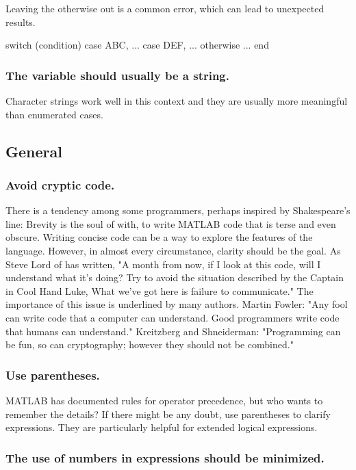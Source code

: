 \documentclass[titlepage,a4paper,12pt]{article}
\begin{document}
Leaving
the otherwise out is a common error, which can lead to unexpected
results.
\begin{verbmcode}
switch (condition)
    case ABC,
        ...
    case DEF,
        ...
    otherwise
        ...
end
\end{verbmcode}

\subsubsection{The  variable should usually be a string.}
 Character strings
work well in this context and they are usually more meaningful than
enumerated cases.

\subsection{General}

\subsubsection{Avoid cryptic code.}

 There is a tendency among some programmers,
perhaps inspired by Shakespeare's line: Brevity is the soul of with,
to write MATLAB code that is terse and even obscure. Writing concise
code can be a way to explore the features of the language. However,
in almost every circumstance, clarity should be the goal. As Steve
Lord of \TMW has written, "A month from now, if I look at this code,
will I understand what it's doing? Try to avoid the situation
described by the Captain in Cool Hand Luke, What we've got here is
failure to communicate." The importance of this issue is underlined
by many authors. Martin Fowler: "Any fool can write code that a
computer can understand. Good programmers write code that humans can
understand." Kreitzberg and Shneiderman: "Programming can be fun, so
can cryptography; however they should not be combined."

\subsubsection{Use parentheses.}

 MATLAB has documented rules for operator
precedence, but who wants to remember the details? If there might be
any doubt, use parentheses to clarify expressions. They are
particularly helpful for extended logical expressions.

\subsubsection{The use of numbers in expressions should be
minimized.}
\end{document}
